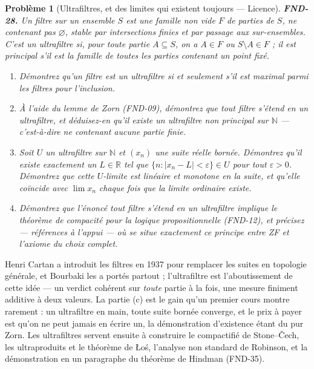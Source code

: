 \documentclass[11pt]{article}
\newtheorem{problem}{Problème}
\begin{document}
\bigskip

\begin{problem}[{Ultrafiltres, et des limites qui existent toujours --- Licence}]
\textbf{FND-28.} Un \textit{filtre} sur un ensemble $ S $ est une famille non vide $ F $ de
parties de $ S $, ne contenant pas $ \varnothing $, stable par intersections finies et par
passage aux sur-ensembles. C'est un \textit{ultrafiltre} si, pour toute partie
$ A \subseteq S $, on a $ A \in F $ ou $ S \setminus A \in F $ ; il est \textit{principal}
s'il est la famille de toutes les parties contenant un point fixé.
\begin{enumerate}
\item[(a)] Démontrez qu'un filtre est un ultrafiltre si et seulement s'il est maximal parmi les filtres
pour l'inclusion.
\item[(b)] À l'aide du lemme de Zorn (FND-09), démontrez que tout filtre s'étend en un ultrafiltre, et
déduisez-en qu'il existe un ultrafiltre non principal sur $\mathbb{N}$ --- c'est-à-dire ne contenant aucune
partie finie.
\item[(c)] Soit $ U $ un ultrafiltre sur $\mathbb{N}$ et $ (x_n) $ une suite réelle bornée. Démontrez qu'il
existe exactement un $ L \in \mathbb{R} $ tel que $ \{ n : |x_n - L| < \varepsilon \} \in U $
pour tout $ \varepsilon > 0 $. Démontrez que cette $ U $-limite est linéaire et monotone en la
suite, et qu'elle coïncide avec $ \lim x_n $ chaque fois que la limite ordinaire existe.
\item[(d)] Démontrez que l'énoncé \og{} tout filtre s'étend en un ultrafiltre \fg{} implique le théorème de
compacité pour la logique propositionnelle (FND-12), et précisez --- références à l'appui --- où se
situe exactement ce principe entre ZF et l'axiome du choix complet.
\end{enumerate}

\end{problem}

\noindent Henri Cartan a introduit les filtres en 1937 pour remplacer les suites en
topologie générale, et Bourbaki les a portés partout ; l'ultrafiltre est l'aboutissement de cette
idée --- un verdict cohérent sur \textit{toute} partie à la fois, une mesure finiment additive à deux
valeurs. La partie (c) est le gain qu'un premier cours montre rarement : un ultrafiltre en main,
toute suite bornée converge, et le prix à payer est qu'on ne peut jamais en écrire un, la
démonstration d'existence étant du pur Zorn. Les ultrafiltres servent ensuite à construire le
compactifié de Stone--\v{C}ech, les ultraproduits et le théorème de \L{}o\'s, l'analyse non standard de
Robinson, et la démonstration en un paragraphe du théorème de Hindman (FND-35).
\end{document}
